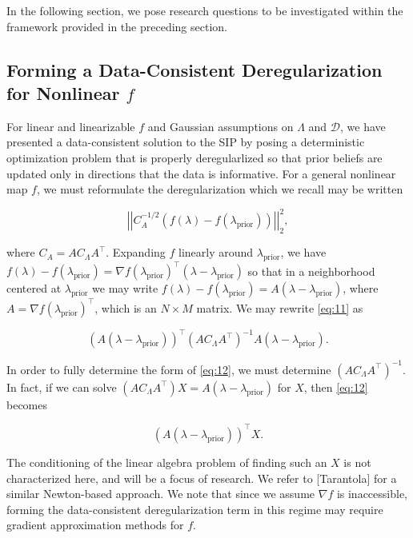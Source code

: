 \documentclass{amsart}
\begin{document}
In the following section, we pose research questions to be investigated within the framework provided in the preceding section. 

\subsection{Forming a Data-Consistent Deregularization for Nonlinear $f$} For linear and linearizable $f$ and Gaussian assumptions on $\Lambda$ and $\mathcal{D}$, we have presented a data-consistent solution to the SIP by posing a deterministic optimization problem that is properly deregularlized so that prior beliefs are updated only in directions that the data is informative. For a general nonlinear map $f$, we must reformulate the deregularization which we recall may be written

\begin{equation} \label{eq:11}
\left|\left|C_A^{-1/2}(f(\lambda)-f(\lambda_{\text{prior}}))\right|\right|_2^2,
\end{equation} 

\noindent where $C_A=AC_\Lambda A^\top$. Expanding $f$ linearly around $\lambda_\text{prior}$, we have $f(\lambda)-f(\lambda_\text{prior})=\nabla f (\lambda_\text{prior})^\top (\lambda-\lambda_\text{prior})$ so that in a neighborhood centered at $\lambda_\text{prior}$ we may write $f(\lambda)-f(\lambda_\text{prior})=A (\lambda-\lambda_\text{prior})$, where $A=\nabla f (\lambda_\text{prior})^\top$, which is an $N \times M$ matrix. We may rewrite \eqref{eq:11} as


\begin{equation} \label{eq:12}
(A(\lambda-\lambda_\text{prior}))^\top (AC_\Lambda A^\top)^{-1}A(\lambda-\lambda_\text{prior}).
\end{equation}

In order to fully determine the form of \eqref{eq:12}, we must determine $(AC_\Lambda A^\top)^{-1}$. In fact, if we can solve $(AC_\Lambda A^\top)X=A(\lambda-\lambda_\text{prior})$ for $X$, then \eqref{eq:12} becomes

\begin{equation} \label{eq:13}
(A(\lambda-\lambda_\text{prior}))^\top X.
\end{equation}

The conditioning of the linear algebra problem of finding such an $X$ is not characterized here, and will be a focus of research. We refer to [Tarantola] for a similar Newton-based approach. We note that since we assume $\nabla f$ is inaccessible, forming the data-consistent deregularization term in this regime may require gradient approximation methods for $f$.
\end{document}

